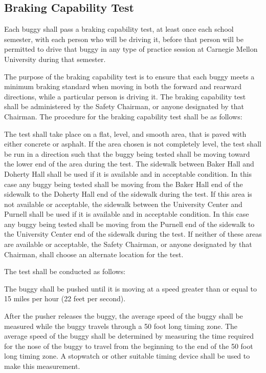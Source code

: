 \subsection{Braking Capability Test}

	Each buggy shall pass a braking capability test, at least once each school
	semester, with each person who will be driving it, before that person will be
	permitted to drive that buggy in any type of practice session at Carnegie
	Mellon University during that semester.

	The purpose of the braking capability test is to ensure that each buggy meets a
	minimum braking standard when moving in both the forward and rearward
	directions, while a particular person is driving it. The braking capability
	test shall be administered by the Safety Chairman, or anyone designated by that
	Chairman. The procedure for the braking capability test shall be as follows:

	The test shall take place on a flat, level, and smooth area, that is paved with
	either concrete or asphalt. If the area chosen is not completely level, the
	test shall be run in a direction such that the buggy being tested shall be
	moving toward the lower end of the area during the test. The sidewalk between
	Baker Hall and Doherty Hall shall be used if it is available and in acceptable
	condition. In this case any buggy being tested shall be moving from the Baker
	Hall end of the sidewalk to the Doherty Hall end of the sidewalk during the
	test. If this area is not available or acceptable, the sidewalk between the
	University Center and Purnell shall be used if it is available and in
	acceptable condition. In this case any buggy being tested shall be moving from
	the Purnell end of the sidewalk to the University Center end of the sidewalk
	during the test. If neither of these areas are available or acceptable, the
	Safety Chairman, or anyone designated by that Chairman, shall choose an
	alternate location for the test.

	The test shall be conducted as follows:

	The buggy shall be pushed until it is moving at a speed greater than or equal
	to 15 miles per hour (22 feet per second).

	After the pusher releases the buggy, the average speed of the buggy shall be
	measured while the buggy travels through a 50 foot long timing zone. The
	average speed of the buggy shall be determined by measuring the time required
	for the nose of the buggy to travel from the beginning to the end of the 50
	foot long timing zone. A stopwatch or other suitable timing device shall be
	used to make this measurement.

